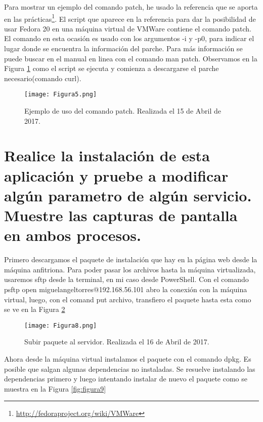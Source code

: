 Para mostrar un ejemplo del comando patch, he usado la referencia que se aporta en las prácticas\footnote{\url{http://fedoraproject.org/wiki/VMWare}}. 
El script que aparece en la referencia para dar la posibilidad de usar Fedora 20 en una máquina virtual de VMWare contiene el comando patch.
El comando en esta ocasión es usado con los argumentos -i y -p0, para indicar el lugar donde se encuentra la información del parche. Para
más información se puede buscar en el manual en linea con el comando man patch\cite{manpatch}.
Observamos en la Figura \ref{fig:figura5} como el script se ejecuta y comienza a descargarse el parche necesario(comando curl).

\begin{figure}[H] 
\centering
\texttt{[image: Figura5.png]}  
\caption{Ejemplo de uso del comando patch. Realizada el 15 de Abril de 2017.} \label{fig:figura5}
\end{figure}






\section{Realice la instalación de esta aplicación y pruebe a modificar algún parametro de algún servicio. Muestre las capturas de pantalla en ambos procesos.}

Primero descargamos el paquete de instalación que hay en la página web desde la máquina anfitriona. Para poder pasar los archivos hasta la máquina virtualizada, 
usaremos sftp desde la terminal, en mi caso desde PowerShell. Con el comando psftp open miguelangeltorres@192.168.56.101 abro la conexión con la máquina  virtual,
luego, con el comand put archivo, transfiero el paquete hasta esta como se ve en la Figura \ref{fig:figura8}

\begin{figure}[H] 
\centering
\texttt{[image: Figura8.png]}  
\caption{Subir paquete al servidor. Realizada el 16 de Abril de 2017.} \label{fig:figura8}
\end{figure}

Ahora desde la máquina virtual instalamos el paquete con el comando dpkg\cite{dpkg}. Es posible que salgan algunas dependencias no instaladas.
Se resuelve instalando las dependencias primero y luego intentando instalar de nuevo el paquete como se muestra en la Figura \ref{fig:figura9}

